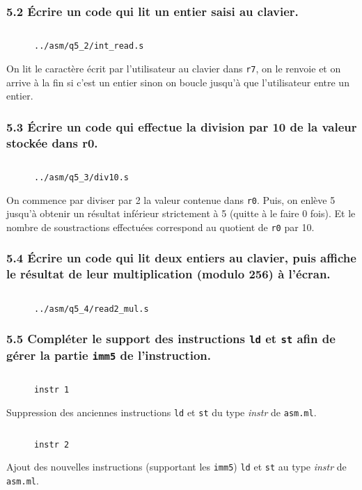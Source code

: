 \documentclass[twoside, 12pt, a4paper]{article}
\newcommand{\fm}[2]{
\begin{figure}[!h]
    \centering
    \inputminted[]{asm}{#1}
    \caption{\texttt{#2}}
\end{figure}
}
\newcommand{\fmo}[4]{
\begin{figure}[!h]
    \centering
    \inputminted[firstline=#3, lastline=#4]{ocaml}{#1}
    \caption{\texttt{#2}}
\end{figure}
}
\begin{document}
        \subsubsection*{\textbf{5.2} Écrire un code qui lit un entier saisi au clavier.}

\fm{../asm/q5_2/int_read.s}{../asm/q5\_2/int\_read.s}

On lit le caractère écrit par l'utilisateur au clavier dans \texttt{r7}, on le renvoie et on arrive à la fin si c'est un entier sinon on boucle jusqu'à que l'utilisateur entre un entier.
         
        \subsubsection*{\textbf{5.3} Écrire un code qui effectue la division par 10 de la valeur stockée dans r0.}

\fm{../asm/q5_3/div10.s}{../asm/q5\_3/div10.s}

On commence par diviser par 2 la valeur contenue dans \texttt{r0}. Puis, on enlève 5 jusqu'à obtenir un résultat inférieur strictement à 5 (quitte à le faire 0 fois). Et le nombre de soustractions effectuées correspond au quotient de \texttt{r0} par 10.

        \subsubsection*{\textbf{5.4} Écrire un code qui lit deux entiers au clavier, puis affiche le résultat de leur multiplication (modulo 256) à l'écran.}

\fm{../asm/q5_4/read2_mul.s}{../asm/q5\_4/read2\_mul.s}

\clearpage
        
        \subsubsection*{\textbf{5.5} Compléter le support des instructions \texttt{ld} et \texttt{st} afin de gérer la partie \texttt{imm5} de l'instruction.}

\fmo{../patch/digcomp_jb.patch.dbu}{instr 1}{14}{15}

Suppression des anciennes instructions \texttt{ld} et \texttt{st} du type \textit{instr} de \texttt{asm.ml}.

\fmo{../patch/digcomp_jb.patch.dbu}{instr 2}{18}{19}

Ajout des nouvelles instructions (supportant les \texttt{imm5}) \texttt{ld} et \texttt{st} au type \textit{instr} de \texttt{asm.ml}.
\end{document}
